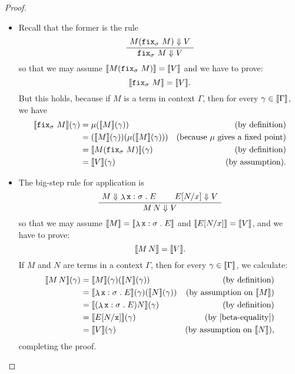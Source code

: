 \begin{proof}
  \begin{itemize}
  \item Recall that the former is the rule
  \[
    \AxiomC{\(M(\pcffix_{\sigma} \, M) \bigstep V\)}
    \UnaryInfC{\({\pcffix_{\sigma} \, M} \bigstep V\)}
    \DisplayProof
  \]
  so that we may assume \(\llbracket M(\operatorname{\mathtt{fix}}_\sigma\,M)\rrbracket = \llbracket V\rrbracket\) and we
  have to prove:
  \[
    \llbracket\operatorname{\mathtt{fix}}_{\sigma} \, M\rrbracket = \llbracket V\rrbracket.
  \]
  But this holds, because if \(M\) is a term in context \(\Gamma\), then for
  every \(\gamma \in \llbracket\Gamma\rrbracket\), we have
  \begin{align*}
    \densem{\pcffix_{\sigma} \,M}(\gamma)
    &= \mu\pa*{\densem{M}(\gamma)}
    &\text{(by definition)} \\
    &= \pa*{\densem{M}(\gamma)}\pa*{\mu\pa*{\densem{M}(\gamma)}}
    &\text{(because \(\mu\) gives a fixed point)} \\
    &= \densem{M\pa*{\pcffix_{\sigma}\,M}}(\gamma)
    &\text{(by definition)} \\
    &= \densem{V}(\gamma) &\text{(by assumption)}.
  \end{align*}
  \item   The big-step rule for application is
  \[
    \AxiomC{\(M \bigstep \lambdadot{\var x : \sigma}{E}\)}
    \AxiomC{\(E[N/x] \bigstep V\)}
    \BinaryInfC{\(M \, N \bigstep V\)}
    \DisplayProof
  \]
  so that we may assume
  \(\llbracket M\rrbracket = \llbracket\mathop{\lambda}{\mathtt x : \sigma}\mathrel{.}E\rrbracket\)
  and
  \(\llbracket E[N/x]\rrbracket = \llbracket V\rrbracket\),
  and we have to prove:
  \[
    \llbracket M \, N\rrbracket = \llbracket V\rrbracket.
  \]
  If \(M\) and \(N\) are terms in a context \(\Gamma\), then for every
  \(\gamma \in \llbracket\Gamma\rrbracket\), we calculate:
  \begin{align*}
    \densem{M \, N}(\gamma)
    &= \densem{M}(\gamma)\pa*{\densem{N}(\gamma)}
    &\text{(by definition)} \\
    &= \densem{\lambdadot{\var x : \sigma}{E}}(\gamma)\pa*{\densem{N}(\gamma)}
    &\text{(by assumption on \(\densem{M}\))} \\
    &= \densem*{\pa*{\lambdadot{\var x : \sigma}{E}}N}(\gamma)
    &\text{(by definition)} \\
    &= \densem{E[N/\var x]}(\gamma)
    &\text{(by \cref{beta-equality})} \\
    &= \densem{V}(\gamma)
    &\text{(by assumption on \(\densem{N}\))},
  \end{align*}
  completing the proof. \qedhere
  \end{itemize}
\end{proof}

